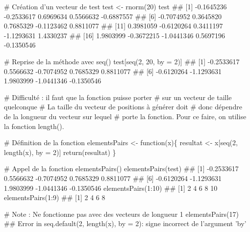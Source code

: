 \documentclass[12pt,twosided, notitlepage]{book}
\newenvironment{Shaded}{}{}
\newcommand{\KeywordTok}[1]{\textcolor[rgb]{0.00,0.00,1.00}{{#1}}}
\newcommand{\DataTypeTok}[1]{{#1}}
\newcommand{\DecValTok}[1]{{#1}}
\newcommand{\StringTok}[1]{\textcolor[rgb]{0.00,0.50,0.50}{{#1}}}
\newcommand{\CommentTok}[1]{\textcolor[rgb]{0.00,0.50,0.00}{{#1}}}
\newcommand{\NormalTok}[1]{{#1}}
\renewenvironment{Shaded}{\begin{snugshade}}{\end{snugshade}}
\begin{document}
\begin{enumerate}
\begin{Shaded}
\begin{Highlighting}[]
\CommentTok{# Création d'un vecteur de test}
\NormalTok{test <-}\StringTok{ }\KeywordTok{rnorm}\NormalTok{(}\DecValTok{20}\NormalTok{)}
\NormalTok{test}
  \NormalTok{##  [1] -0.1645236 -0.2533617  0.6969634  0.5566632 -0.6887557}
  \NormalTok{##  [6] -0.7074952  0.3645820  0.7685329 -0.1123462  0.8811077}
  \NormalTok{## [11]  0.3981059 -0.6120264  0.3411197 -1.1293631  1.4330237}
  \NormalTok{## [16]  1.9803999 -0.3672215 -1.0441346  0.5697196 -0.1350546}

\CommentTok{# Reprise de la méthode avec seq()}
\NormalTok{test[}\KeywordTok{seq}\NormalTok{(}\DecValTok{2}\NormalTok{, }\DecValTok{20}\NormalTok{, }\DataTypeTok{by =} \DecValTok{2}\NormalTok{)]}
  \NormalTok{##  [1] -0.2533617  0.5566632 -0.7074952  0.7685329  0.8811077}
  \NormalTok{##  [6] -0.6120264 -1.1293631  1.9803999 -1.0441346 -0.1350546}

\CommentTok{# Difficulté : il faut que la fonction puisse porter}
\CommentTok{# sur un vecteur de taille quelconque}
\CommentTok{# La taille du vecteur de positions à générer doit}
\CommentTok{# donc dépendre de la longueur du vecteur sur lequel}
\CommentTok{# porte la fonction. Pour ce faire, on utilise la fonction length().}

\CommentTok{# Définition de la fonction}
\NormalTok{elementsPairs <-}\StringTok{ }\NormalTok{function(x)\{}
  \NormalTok{resultat <-}\StringTok{ }\NormalTok{x[}\KeywordTok{seq}\NormalTok{(}\DecValTok{2}\NormalTok{, }\KeywordTok{length}\NormalTok{(x), }\DataTypeTok{by =} \DecValTok{2}\NormalTok{)]}
  \KeywordTok{return}\NormalTok{(resultat)}
\NormalTok{\}}

\CommentTok{# Appel de la fonction elementsPairs()}
\KeywordTok{elementsPairs}\NormalTok{(test)}
  \NormalTok{##  [1] -0.2533617  0.5566632 -0.7074952  0.7685329  0.8811077}
  \NormalTok{##  [6] -0.6120264 -1.1293631  1.9803999 -1.0441346 -0.1350546}
\KeywordTok{elementsPairs}\NormalTok{(}\DecValTok{1}\NormalTok{:}\DecValTok{10}\NormalTok{)}
  \NormalTok{## [1]  2  4  6  8 10}
\KeywordTok{elementsPairs}\NormalTok{(}\DecValTok{1}\NormalTok{:}\DecValTok{9}\NormalTok{)}
  \NormalTok{## [1] 2 4 6 8}

\CommentTok{# Note : Ne fonctionne pas avec des vecteurs de longueur 1}
\KeywordTok{elementsPairs}\NormalTok{(}\DecValTok{17}\NormalTok{)}
  \NormalTok{## Error in seq.default(2, length(x), by = 2): signe incorrect de l'argument 'by'}
\end{Highlighting}
\end{Shaded}


\end{enumerate}
\end{document}
